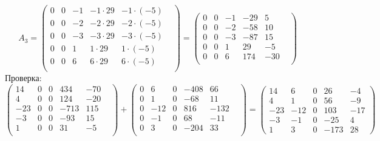 \documentclass[a4paper,12pt]{article}
\begin{document}
\[
A_3 = 
\begin{pmatrix}
0 & 0 & -1 & -1 \cdot 29& -1 \cdot (-5)& \\
0 & 0 & -2 & -2\cdot 29& -2 \cdot (-5)& \\
0 & 0 & -3 & -3 \cdot 29& -3 \cdot (-5) & \\
0 & 0& 1 & 1 \cdot 29& 1  \cdot (-5)& \\
0& 0 & 6 & 6\cdot 29 & 6 \cdot (-5) & \\
\end{pmatrix} 
=
\begin{pmatrix}
0 & 0 & -1 & -29& 5& \\
0 & 0 & -2 & -58& 10& \\
0 & 0 & -3 & -87& 15 & \\
0 & 0& 1 & 29& -5& \\
0& 0 & 6 & 174 & -30 & \\
\end{pmatrix} 
\]
Проверка:
\[
\begin{pmatrix}
14 & 0& 0& 434 & -70 & \\
4 & 0 & 0 & 124& -20& \\
-23 & 0 & 0 & -713& 115& \\
-3 & 0 & 0& -93& 15& \\
1 & 0& 0 & 31& -5& \\
\end{pmatrix}  
+
\begin{pmatrix}
0 & 6 & 0 & -408 & 66& \\
0 & 1 & 0&   -68 & 11& \\
0& -12 & 0 & 816 & -132& \\
0 & -1 & 0 & 68 & -11& \\
0& 3 & 0 & -204 & 33 & \\
\end{pmatrix} 
=
\left(\begin{matrix}
14 & 6 & 0 & 26 & -4 \\
4 & 1 & 0 & 56 & -9 \\
-23 & -12 & 0 & 103 & -17 \\
-3 & -1 & 0 & -25 & 4 \\
1 & 3 & 0 & -173 & 28
\end{matrix}\right)
\]
\end{document}
